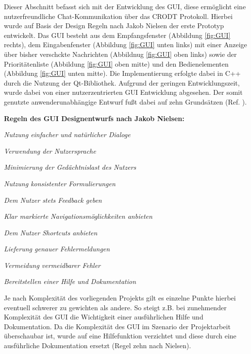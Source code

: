 \label{cap:chatGui}

Dieser Abschnitt befasst sich mit der Entwicklung des \gls{GUI}, diese
erm{\"o}glicht eine nutzerfreundliche Chat-Kommunikation über das \gls{CRODT}
Protokoll.
Hierbei wurde auf Basis der Design Regeln nach Jakob Nielsen der erste Prototyp
entwickelt. Das GUI besteht aus dem Empfangsfenster (Abbildung \ref{fig:GUI}
rechts), dem Eingabenfenster (Abbildung \ref{fig:GUI}
unten links) mit einer Anzeige über bisher verschckte Nachrichten
(Abbildnug \ref{fig:GUI} oben links) sowie der Priorit{\"a}tenliste
(Abbildung \ref{fig:GUI} oben mitte) und den Bedienelementen (Abbildung
\ref{fig:GUI} unten mitte). Die Implementierung erfolgte dabei in C++
durch die Nutzung der Qt-Bibliothek. Aufgrund der geringen Entwicklungszeit,
wurde dabei von einer nutzerzentrierten \gls{GUI} Entwicklung abgesehen. Der
somit genutzte anwenderunabh{\"a}ngige Entwurf fu{\ss}t dabei auf zehn
Grunds{\"a}tzen (Ref. \cite{Nielsen}).

\textbf{Regeln des \gls{GUI} Designentwurfs nach Jakob Nielsen:}

   \begin{compactenum}[I]
     \item \textit{Nutzung einfacher und nat{\"u}rlicher Dialoge}
     \item \textit{Verwendung der Nutzersprache}
     \item \textit{Minimierung der Ged{\"a}chtnislast des Nutzers}
     \item \textit{Nutzung konsistenter Formulierungen}
     \item \textit{Dem Nutzer stets Feedback geben}
     \item \textit{Klar markierte Navigationsm{\"o}glichkeiten anbieten}
     \item \textit{Dem Nutzer Shortcuts anbieten}
     \item \textit{Lieferung genauer Fehlermeldungen}
     \item \textit{Vermeidung vermeidbarer Fehler}
     \item \textit{Bereitstellen einer Hilfe und Dokumentation}
   \end{compactenum}
   \label{Nielsen}
   

Je nach Komplexit{\"a}t des vorliegenden Projekts gilt es einzelne Punkte
hierbei eventuell schwerer zu gewichten als andere. So steigt z.B. bei
zunehmender Komplexit{\"a}t des \gls{GUI} die Wichtigkeit einer ausf{\"u}hrlichen
Hilfe und Dokumentation. Da die Komplexit{\"a}t des \gls{GUI} im Szenario der
Projektarbeit {\"u}berschaubar ist, wurde auf eine Hilfefunktion verzichtet
und diese durch eine ausf{\"u}hrliche Dokumentation ersetzt (Regel zehn nach
Nielsen).

